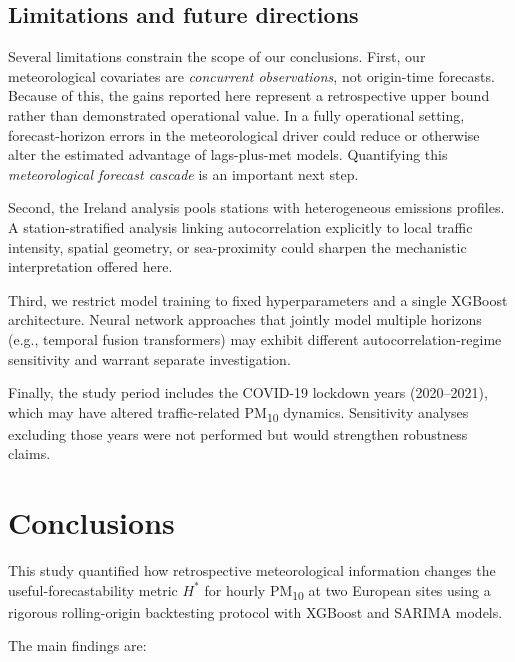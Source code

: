 \documentclass[12pt,a4paper]{article}
\newcommand{\PMten}{PM\textsubscript{10}}
\begin{document}
\subsection{Limitations and future directions}

Several limitations constrain the scope of our conclusions.  First, our
meteorological covariates are \emph{concurrent observations}, not origin-time forecasts.
Because of this, the gains reported here represent a retrospective upper bound rather than
demonstrated operational value. In a fully operational setting, forecast-horizon errors
in the meteorological driver could reduce or otherwise alter the estimated advantage of
lags-plus-met models.  Quantifying this \emph{meteorological forecast cascade} is an important next step.

Second, the Ireland analysis pools stations with heterogeneous emissions
profiles.  A station-stratified analysis linking autocorrelation explicitly to
local traffic intensity, spatial geometry, or sea-proximity could sharpen
the mechanistic interpretation offered here.

Third, we restrict model training to fixed hyperparameters and a single
XGBoost architecture.  Neural network approaches that jointly model multiple
horizons (e.g., temporal fusion transformers) may exhibit different
autocorrelation-regime sensitivity and warrant separate investigation.

Finally, the study period includes the COVID-19 lockdown years (2020--2021),
which may have altered traffic-related \PMten{} dynamics.  Sensitivity
analyses excluding those years were not performed but would strengthen
robustness claims.

\section{Conclusions}
\label{sec:conclusions}

This study quantified how retrospective meteorological information changes
the useful-forecastability metric $H^*$ for hourly \PMten{} at two European sites using a
rigorous rolling-origin backtesting protocol with XGBoost and SARIMA models.

The main findings are:
\end{document}

